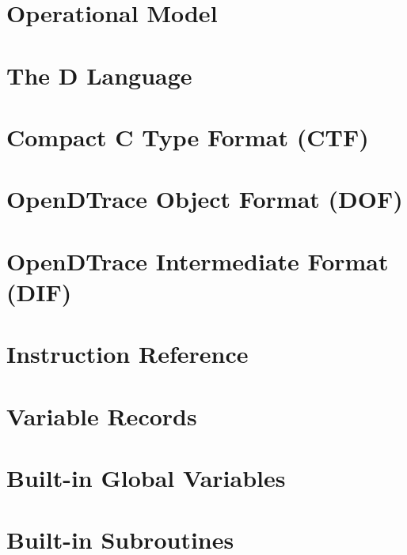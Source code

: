 \chapter{Operational Model}
\label{chap:opendtrace-operation}


\chapter{The D Language}
\label{chap:opendtrace-dlang}


\chapter{Compact C Type Format (CTF)}
\label{chap:opendtrace-ctf}


\chapter{OpenDTrace Object Format (DOF)}
\label{chap:opendtrace-object-format}


\chapter{OpenDTrace Intermediate Format (DIF)}
\label{chap:opendtrace-intermediate-format}


\chapter{Instruction Reference}
\label{chap:opendtrace-instruction-reference}


\chapter{Variable Records}
\label{chap:opendtrace-variable-records}


\chapter{Built-in Global Variables}
\label{chap:opendtrace-global-vars}


\chapter{Built-in Subroutines}
\label{chap:opendtrace-subroutines}


